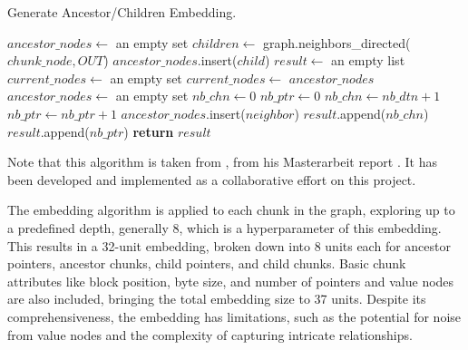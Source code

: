 \begin{algorithm}[H]
    \caption{Generate Ancestor/Children Embedding.}
    \label{algo:embedding:generate_ancestor_children_embedding}
    \begin{algorithmic}
            \State $ancestor\_nodes \gets$ an empty set
            \State $children \gets$ graph.neighbors\_directed($chunk\_node, OUT$) 
                \State $ancestor\_nodes$.insert($child$)
            \EndFor
            \State $result \gets$ an empty list
            \State $current\_nodes \gets$ an empty set
                \State $current\_nodes \gets$ $ancestor\_nodes$ 
                \State $ancestor\_nodes \gets$ an empty set
                \State $nb\_chn \gets 0$
                \State $nb\_ptr \gets 0$
                     
                        \State $nb\_chn \gets nb\_dtn + 1$
                        \State $nb\_ptr \gets nb\_ptr + 1$
                    \EndIf
                        \State $ancestor\_nodes$.insert($neighbor$) 
                    \EndFor
                \EndFor
                \State $result$.append($nb\_chn$) 
                \State $result$.append($nb\_ptr$) 
            \EndFor
            \State \textbf{return} $result$
        \EndFunction
    \end{algorithmic}
\end{algorithm}

Note that this algorithm is taken from \citeauthor{ClementEmbeddingsMasterarbeit23}, from his Masterarbeit report \cite{ClementEmbeddingsMasterarbeit23}. It has been developed and implemented as a collaborative effort on this project.

The embedding algorithm is applied to each chunk in the graph, exploring up to a predefined depth, generally 8, which is a hyperparameter of this embedding. This results in a 32-unit embedding, broken down into 8 units each for ancestor pointers, ancestor chunks, child pointers, and child chunks. Basic chunk attributes like block position, byte size, and number of pointers and value nodes are also included, bringing the total embedding size to 37 units. Despite its comprehensiveness, the embedding has limitations, such as the potential for noise from value nodes and the complexity of capturing intricate relationships.

